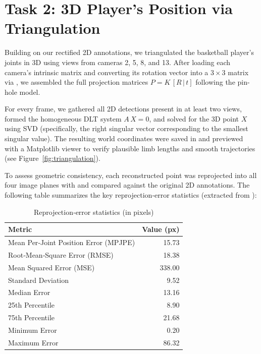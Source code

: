 \documentclass[11pt,a4paper]{article}
\begin{document}
\section*{Task 2: 3D Player’s Position via Triangulation}

Building on our rectified 2D annotations, we triangulated the basketball player’s joints in 3D using views from cameras 2, 5, 8, and 13. After loading each camera’s intrinsic matrix and converting its rotation vector into a $3\times3$ matrix via , we assembled the full projection matrices $P = K\,[R\,|\,t]$ following the pin-hole model.  

For every frame, we gathered all 2D detections present in at least two views, formed the homogeneous DLT system $A\,X=0$, and solved for the 3D point $X$ using SVD (specifically, the right singular vector corresponding to the smallest singular value). The resulting world coordinates were saved in  and previewed with a Matplotlib viewer to verify plausible limb lengths and smooth trajectories (see Figure~\ref{fig:triangulation}).

To assess geometric consistency, each reconstructed point was reprojected into all four image planes with  and compared against the original 2D annotations. The following table summarizes the key reprojection‐error statistics (extracted from ):

\begin{table}[htbp]
  \centering
  \caption{Reprojection‐error statistics (in pixels)}
  \label{tab:reproj-errors}
  \begin{tabular}{l r}
    \toprule
    \textbf{Metric}           & \textbf{Value (px)} \\
    \midrule
    Mean Per‐Joint Position Error (MPJPE) & 15.73 \\
    Root‐Mean‐Square Error (RMSE)         & 18.38 \\
    Mean Squared Error (MSE)             & 338.00 \\
    Standard Deviation                   & 9.52  \\
    Median Error                         & 13.16 \\
    25th Percentile                      & 8.90  \\
    75th Percentile                      & 21.68 \\
    Minimum Error                        & 0.20  \\
    Maximum Error                        & 86.32 \\
    \bottomrule
  \end{tabular}
\end{table}
\end{document}
